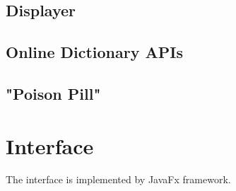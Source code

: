 \documentclass{article}
\begin{document}
\subsection{Displayer}

\subsection{Online Dictionary APIs}

\subsection{"Poison Pill"}


\section{Interface}

The interface is implemented by JavaFx framework.
\end{document}
